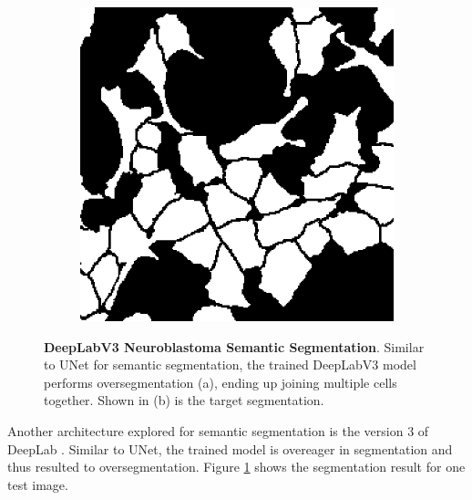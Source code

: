 \documentclass[journal]{IEEEtran}
\begin{document}
\begin{figure}
\begin{subfigure}[b]{0.45\linewidth}
\includegraphics[width=\linewidth]{unet/110115.jpg}
\caption{}
\end{subfigure}
\caption{\textbf{DeepLabV3 Neuroblastoma Semantic Segmentation}. Similar to UNet for semantic segmentation, the trained DeepLabV3 model performs oversegmentation (a), ending up joining multiple cells together. Shown in (b) is the target segmentation.}
\label{fig:deeplab_results}
\end{figure}
Another architecture explored for semantic segmentation is the version 3 of DeepLab \cite{DBLP:journals/corr/ChenPSA17}. Similar to UNet, the trained model is overeager in segmentation and thus resulted to oversegmentation. Figure \ref{fig:deeplab_results} shows the segmentation result for one test image.
\end{document}
